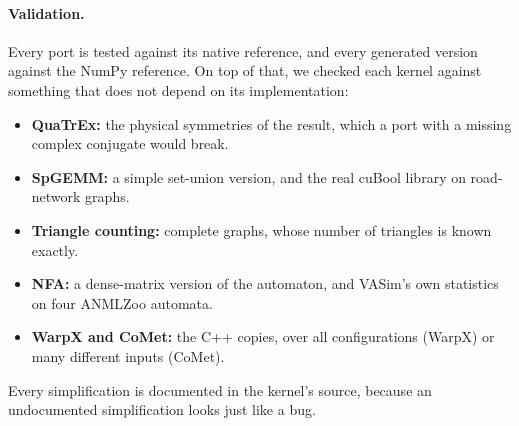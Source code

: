 \paragraph{Validation.}
Every port is tested against its native reference, and every generated version against the
NumPy reference. On top of that, we checked each kernel against something that does not depend
on its implementation:
\begin{itemize}
  \item \textbf{QuaTrEx:} the physical symmetries of the result, which a port with a missing
    complex conjugate would break.
  \item \textbf{SpGEMM:} a simple set-union version, and the real cuBool library on
    road-network graphs.
  \item \textbf{Triangle counting:} complete graphs, whose number of triangles is known
    exactly.
  \item \textbf{NFA:} a dense-matrix version of the automaton, and VASim's own statistics on
    four ANMLZoo automata.
  \item \textbf{WarpX and CoMet:} the C++ copies, over all configurations (WarpX) or many
    different inputs (CoMet).
\end{itemize}
Every simplification is documented in the kernel's source, because an undocumented
simplification looks just like a bug.
